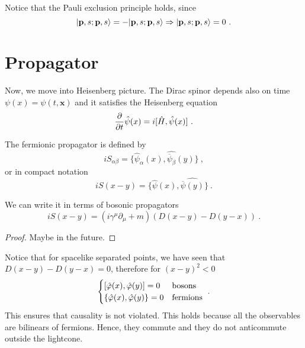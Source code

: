     Notice that the Pauli exclusion principle holds, since 
    \begin{equation*}
        \vert\mathbf p, s; \mathbf p, s\rangle = - \vert\mathbf p, s; \mathbf p, s\rangle  \Rightarrow \vert\mathbf p, s; \mathbf p, s\rangle = 0~.
    \end{equation*}

\chapter{Propagator} 

    Now, we move into Heisenberg picture. The Dirac spinor depends also on time $\psi(x) = \psi(t, \mathbf x)$ and it satisfies the Heisenberg equation 
    \begin{equation*}
        \frac{\partial}{\partial t} \hat \psi(x) = i [\hat H, \hat \psi (x)] ~.
    \end{equation*}

    The fermionic propagator is defined by 
    \begin{equation*}
        i S_{\alpha\beta} = \{\hat \psi_\alpha (x), \hat{ \overline \psi_\beta} (y)\} ~,
    \end{equation*}
    or in compact notation 
    \begin{equation*}
        i S(x - y) = \{\hat \psi (x), \hat{\overline \psi(y)}\} ~.
    \end{equation*}

    We can write it in terms of bosonic propagators 
    \begin{equation*}
        i S(x - y) = (i \gamma^\mu \partial_\mu + m) (D(x-y) - D(y-x)) ~.
    \end{equation*}
    \begin{proof}
        Maybe in the future.
    \end{proof}

    Notice that for spacelike separated points, we have seen that $D(x-y) - D(y-x) = 0$, therefore for $(x-y)^2 < 0$
    \begin{equation*}
        \begin{cases}
            [\hat \varphi (x), \hat \varphi (y)] = 0 & \textnormal{bosons} \\
            \{\hat \varphi (x), \hat \varphi (y)\} = 0 & \textnormal{fermions} \\
        \end{cases} ~.
    \end{equation*}
    This ensures that causality is not violated. This holds because all the observables are bilinears of fermions. Hence, they commute and they do not anticommute outside the lightcone. 

